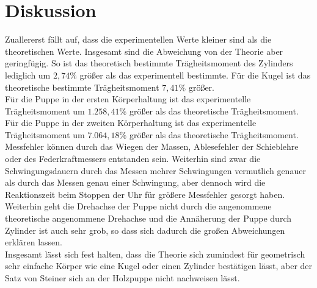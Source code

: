 \newpage
\section{Diskussion}
\label{sec:Diskussion}
Zuallererst fällt auf, dass die experimentellen Werte kleiner sind als die theoretischen Werte.
Insgesamt sind die Abweichung von der Theorie aber geringfügig. So ist das theoretisch bestimmte Trägheitsmoment
des Zylinders lediglich um $2{,}74\%$ größer als das experimentell bestimmte. Für die Kugel ist das theoretische bestimmte 
Trägheitsmoment $7{,}41\%$ größer.\\
Für die Puppe in der ersten Körperhaltung ist das experimentelle Trägheitsmoment um $1.258{,}41 \%$ größer als das theoretische Trägheitsmoment.
Für die Puppe in der zweiten Körperhaltung ist das experimentelle Trägheitsmoment um $7.064{,}18 \%$  größer als das theoretische Trägheitsmoment.\\
Messfehler können durch das Wiegen der Massen, Ablesefehler der Schieblehre oder des Federkraftmessers entstanden sein. Weiterhin sind zwar die
Schwingungsdauern durch das Messen mehrer Schwingungen vermutlich genauer als durch das Messen genau einer Schwingung, aber dennoch wird die Reaktionszeit beim 
Stoppen der Uhr für größere Messfehler gesorgt haben.\\
Weiterhin geht die Drehachse der Puppe nicht durch die angenommene theoretische angenommene Drehachse und die Annäherung der Puppe durch Zylinder ist auch sehr grob,
so dass sich dadurch die großen Abweichungen erklären lassen.\\
Insgesamt lässt sich fest halten, dass die Theorie sich zumindest für geometrisch sehr einfache Körper wie eine Kugel oder einen Zylinder bestätigen lässt, aber
der Satz von Steiner sich an der Holzpuppe nicht nachweisen lässt.

\newpage

